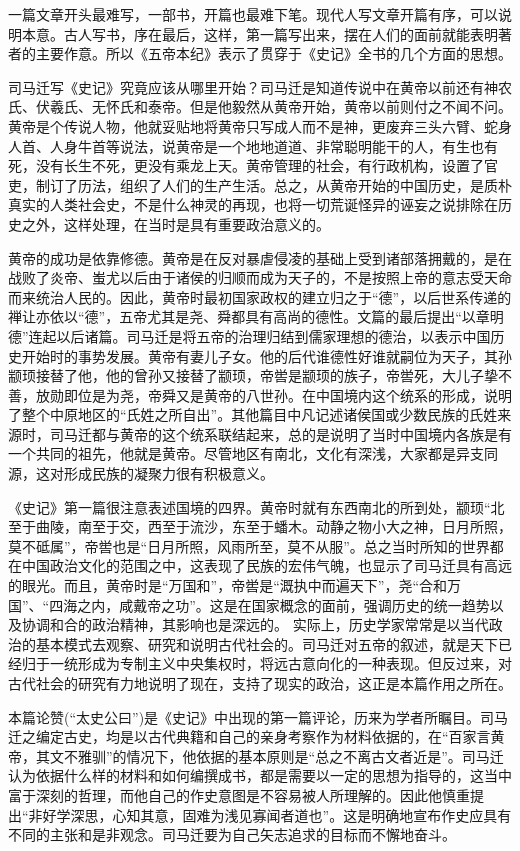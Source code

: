 \documentclass[12pt,UTF8]{ctexbook}
\begin{document}
一篇文章开头最难写，一部书，开篇也最难下笔。现代人写文章开篇有序，可以说明本意。古人写书，序在最后，这样，第一篇写出来，摆在人们的面前就能表明著者的主要作意。所以《五帝本纪》表示了贯穿于《史记》全书的几个方面的思想。

司马迁写《史记》究竟应该从哪里开始？司马迁是知道传说中在黄帝以前还有神农氏、伏羲氏、无怀氏和泰帝。但是他毅然从黄帝开始，黄帝以前则付之不闻不问。黄帝是个传说人物，他就妥贴地将黄帝只写成人而不是神，更废弃三头六臂、蛇身人首、人身牛首等说法，说黄帝是一个地地道道、非常聪明能干的人，有生也有死，没有长生不死，更没有乘龙上天。黄帝管理的社会，有行政机构，设置了官吏，制订了历法，组织了人们的生产生活。总之，从黄帝开始的中国历史，是质朴真实的人类社会史，不是什么神灵的再现，也将一切荒诞怪异的诬妄之说排除在历史之外，这样处理，在当时是具有重要政治意义的。

黄帝的成功是依靠修德。黄帝是在反对暴虐侵凌的基础上受到诸部落拥戴的，是在战败了炎帝、蚩尤以后由于诸侯的归顺而成为天子的，不是按照上帝的意志受天命而来统治人民的。因此，黄帝时最初国家政权的建立归之于“德”，以后世系传递的禅让亦依以“德”，五帝尤其是尧、舜都具有高尚的德性。文篇的最后提出“以章明德”连起以后诸篇。司马迁是将五帝的治理归结到儒家理想的德治，以表示中国历史开始时的事势发展。黄帝有妻儿子女。他的后代谁德性好谁就嗣位为天子，其孙颛顼接替了他，他的曾孙又接替了颛顼，帝喾是颛顼的族子，帝喾死，大儿子挚不善，放勋即位是为尧，帝舜又是黄帝的八世孙。在中国境内这个统系的形成，说明了整个中原地区的“氏姓之所自出”。其他篇目中凡记述诸侯国或少数民族的氏姓来源时，司马迁都与黄帝的这个统系联结起来，总的是说明了当时中国境内各族是有一个共同的祖先，他就是黄帝。尽管地区有南北，文化有深浅，大家都是异支同源，这对形成民族的凝聚力很有积极意义。

《史记》第一篇很注意表述国境的四界。黄帝时就有东西南北的所到处，颛顼“北至于曲陵，南至于交，西至于流沙，东至于蟠木。动静之物小大之神，日月所照，莫不砥属”，帝喾也是“日月所照，风雨所至，莫不从服”。总之当时所知的世界都在中国政治文化的范围之中，这表现了民族的宏伟气魄，也显示了司马迁具有高远的眼光。而且，黄帝时是“万国和”，帝喾是“溉执中而遍天下”，尧“合和万国”、“四海之内，咸戴帝之功”。这是在国家概念的面前，强调历史的统一趋势以及协调和合的政治精神，其影响也是深远的。
实际上，历史学家常常是以当代政治的基本模式去观察、研究和说明古代社会的。司马迁对五帝的叙述，就是天下已经归于一统形成为专制主义中央集权时，将远古意向化的一种表现。但反过来，对古代社会的研究有力地说明了现在，支持了现实的政治，这正是本篇作用之所在。

本篇论赞(“太史公曰”)是《史记》中出现的第一篇评论，历来为学者所瞩目。司马迁之编定古史，均是以古代典籍和自己的亲身考察作为材料依据的，在“百家言黄帝，其文不雅驯”的情况下，他依据的基本原则是“总之不离古文者近是”。司马迁认为依据什么样的材料和如何编撰成书，都是需要以一定的思想为指导的，这当中富于深刻的哲理，而他自己的作史意图是不容易被人所理解的。因此他慎重提出“非好学深思，心知其意，固难为浅见寡闻者道也”。这是明确地宣布作史应具有不同的主张和是非观念。司马迁要为自己矢志追求的目标而不懈地奋斗。
\end{document}
